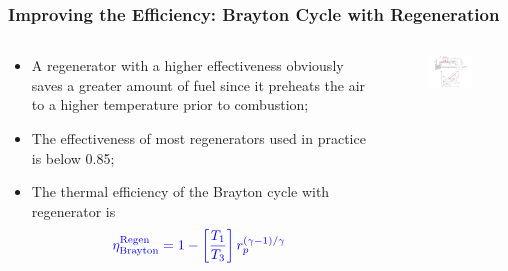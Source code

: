 \documentclass[10pt,compress]{beamer}
\newcommand{\frc}{\displaystyle\frac}
\begin{document}
\begin{frame}
 \frametitle{Improving the Efficiency: Brayton Cycle with Regeneration}
 \begin{columns}
  \begin{column}[c]{0.4\linewidth} 
 \begin{itemize}
  \item <1-> A regenerator with a higher effectiveness obviously saves a greater amount of fuel since it preheats the air to a higher temperature prior to combustion;
  \item <2-> The effectiveness of most regenerators used in practice is below 0.85;
  \item <3-> The thermal efficiency of the Brayton cycle with regenerator is
    \begin{displaymath}
     \textcolor{blue}{\eta_{\text{Brayton}}^{\text{Regen}}= 1 - \left[\frc{T_{1}}{T_{3}}\right] r_{p}^{\left(\gamma-1\right)/\gamma}}
    \end{displaymath} 
   
 \end{itemize}
  \end{column}
  \begin{column}[c]{0.6\linewidth}
    \begin{center}
   \begin{figure}%
     \includegraphics[height=6.cm,width=6.5cm,clip]{./Pics/Brayton_cycle4}
   \end{figure}  
    \end{center}
  \end{column}  
 \end{columns}

\end{frame}
\end{document}
